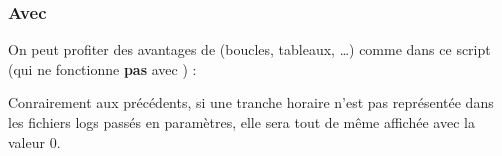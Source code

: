 \subsubsection{Avec }
On peut profiter des avantages de \bash (boucles, tableaux, \ldots) com\-me dans ce script (qui ne fonctionne \textbf{pas} avec \sh) :



Conrairement aux précédents, si une tranche horaire n'est pas représentée dans les fichiers logs passés en paramètres, elle sera tout de même affichée avec la valeur 0. 
